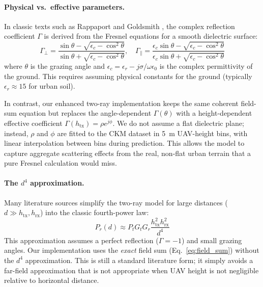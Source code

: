 \paragraph{Physical vs.\ effective parameters.}
In classic texts such as Rappaport \cite{rappaport} and Goldsmith
\cite{goldsmith}, the complex reflection coefficient $\Gamma$ is derived
from the Fresnel equations for a smooth dielectric surface:
\begin{equation}
\Gamma_{\perp} = \frac{\sin\theta - \sqrt{\epsilon_c - \cos^2\theta}}{\sin\theta + \sqrt{\epsilon_c - \cos^2\theta}},
\quad
\Gamma_{\parallel} = \frac{\epsilon_c\sin\theta - \sqrt{\epsilon_c - \cos^2\theta}}{\epsilon_c\sin\theta + \sqrt{\epsilon_c - \cos^2\theta}}
\label{eq:fresnel}
\end{equation}
where $\theta$ is the grazing angle and $\epsilon_c = \epsilon_r - j\sigma/\omega\epsilon_0$
is the complex permittivity of the ground. This requires assuming physical
constants for the ground (typically $\epsilon_r \approx 15$ for urban soil).

In contrast, our enhanced two-ray implementation keeps the same coherent
field-sum equation but
replaces the angle-dependent
$\Gamma(\theta)$ with a height-dependent effective coefficient $\Gamma(h_{\mathrm{tx}})
= \rho e^{j\phi}$. We do not assume a flat dielectric plane; instead, $\rho$
and $\phi$ are fitted to the CKM dataset in 5~m UAV-height bins, with linear
interpolation between bins during prediction. This allows the model to capture
aggregate scattering effects from the real, non-flat urban terrain that a
pure Fresnel calculation would miss.

\paragraph{The $d^4$ approximation.}
Many literature sources \cite{rappaport,goldsmith} simplify the two-ray model
for large distances ($d \gg h_{\mathrm{tx}}, h_{\mathrm{rx}}$) into the
classic fourth-power law:
\begin{equation}
P_r(d) \approx P_t G_t G_r \frac{h_{\mathrm{tx}}^2 h_{\mathrm{rx}}^2}{d^4}
\label{eq:d4_law}
\end{equation}
This approximation assumes a perfect reflection ($\Gamma = -1$) and small
grazing angles. Our implementation uses the \emph{exact} field sum
(Eq.~\ref{eq:field_sum}) without the $d^4$ approximation. This is still a
standard literature form; it simply avoids a far-field approximation that is
not appropriate when UAV height is not negligible relative to horizontal
distance.

